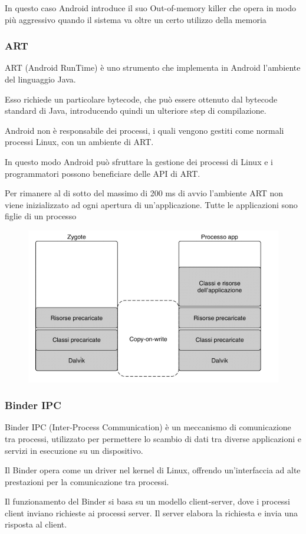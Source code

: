 \spacer
In questo caso Android introduce il suo Out-of-memory killer che opera in modo più aggressivo quando il sistema va oltre un certo utilizzo della memoria

\subsubsection{ART}
ART (Android RunTime) è uno strumento che implementa in Android l'ambiente del linguaggio Java.

Esso richiede un particolare bytecode, che può essere ottenuto dal bytecode standard di Java, introducendo quindi un ulteriore step di compilazione.

\spacer
Android non è responsabile dei processi, i quali vengono gestiti come normali processi Linux, con un ambiente di ART.

In questo modo Android può sfruttare la gestione dei processi di Linux e i programmatori possono beneficiare delle API di ART.

\spacer
Per rimanere al di sotto del massimo di 200 ms di avvio l'ambiente ART non viene inizializzato ad ogni apertura di un'applicazione. Tutte le applicazioni sono figlie di un processo

\begin{figure}[H]
    \centering
    \includegraphics[width=0.5\linewidth]{assets/android-art.png}
\end{figure}

\subsubsection{Binder IPC}
Binder IPC (Inter-Process Communication) è un meccanismo di comunicazione tra processi, utilizzato per permettere lo scambio di dati tra diverse applicazioni e servizi in esecuzione su un dispositivo.

Il Binder opera come un driver nel kernel di Linux, offrendo un'interfaccia ad alte prestazioni per la comunicazione tra processi.

\spacer
Il funzionamento del Binder si basa su un modello client-server, dove i processi client inviano richieste ai processi server. Il server elabora la richiesta e invia una risposta al client.

